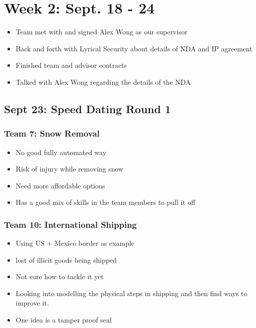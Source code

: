 \chapter{Week 2: Sept. 18 - 24}
\label{week:2}
\begin{itemize}
    \item Team met with and signed Alex Wong as our supervisor
    \item Back and forth with Lyrical Security about details of NDA and IP agreement
    \item Finished team and advisor contracts
    \item Talked with Alex Wong regarding the details of the NDA
\end{itemize}
    
    \section{Sept 23: Speed Dating Round 1}\label{speed-dating-1}
    \subsection{Team 7: Snow Removal}
    \begin{itemize}
    		\item No good fully automated way
    		\item Risk of injury while removing snow
    		\item Need more affordable options
    		\item Has a good mix of skills in the team members to pull it off
    \end{itemize}
    
    \subsection{Team 10: International Shipping}
    		\begin{itemize}
    			\item Using US + Mexico border as example
    			\item lost of illicit goods being shipped
    			\item Not sure how to tackle it yet
    			\item Looking into modelling the physical steps in shipping and then find ways to improve it.
    			\item One idea is a tamper proof seal
    		\end{itemize}
    		
